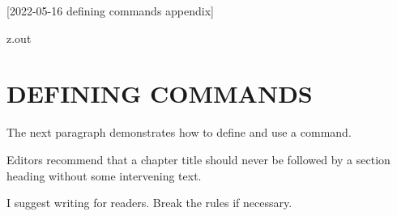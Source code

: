 [2022-05-16 defining commands appendix]

\begin{VerbatimOut}{z.out}
\chapter{DEFINING COMMANDS}

The next paragraph demonstrates how to define and use a command.

\renewcommand{\t}[2]
{%
  Editors recommend that a #1 should never be
  followed by a #2 without some intervening text.
}

\t{chapter title}{section heading}
I suggest writing for readers.
Break the rules if necessary.
\end{VerbatimOut}

\MyIO
